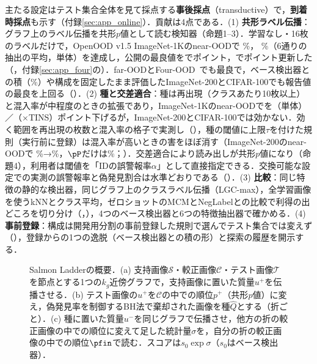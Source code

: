 主たる設定はテスト集合全体を見て採点する\textbf{事後採点}（transductive）で，\textbf{到着時採点}も示す（付録\ref{sec:app_online}）．貢献は4点である．(1) \textbf{共形ラベル伝播}：グラフ上のラベル伝播を共形$p$値として読む検知器（命題1--3）．学習なし・16枚のラベルだけで，OpenOOD v1.5 ImageNet-1Kのnear-OODで\AUC{} \NAloneNearAuroc\%，\FPR{} \NAloneNearFpr\%（6通りの抽出の平均，単体）を達成し，公開の最良値を\AUC{}で\NAloneGapNearAuroc{}ポイント，\FPR{}で\NAloneGapNearFpr{}ポイント更新した（，付録\ref{sec:app_four}の）．far-OODとFour-OOD~\cite{huang2021mos}でも最良で，ベース検出器との積（\NNearFpr\%）や構成を固定したまま評価したImageNet-200とCIFAR-100でも報告値の最良を上回る（）．(2) \textbf{種と交差適合}：種は再出現（クラスあたり10枚以上）と混入率が中程度のときの拡張であり，ImageNet-1Kのnear-OODで\FPR{}を\NAloneNearDfprVsLpAbs{}（単体）／\NNearDfprVsLpAbs{}（$\times$TINS）ポイント下げるが，ImageNet-200とCIFAR-100では効かない．効く範囲を再出現の枚数と混入率の格子で実測し（），種の閾値に上限$\tau$を付けた規則（実行前に登録）は混入率が高いときの害をほぼ消す（ImageNet-200のnear-OODで\FPR{} \NInTwoZeroZeroMainNearFpr\%→\NInTwoZeroZeroStoreycNearFpr\%，$\pP$だけは\NInTwoZeroZeroLpNearFpr\%；）．交差適合により読み出しが共形$p$値になり（命題4），利用者は閾値を「IDの誤警報率$\alpha$」として直接指定できる．交換可能な設定での実測の誤警報率と偽発見割合は水準どおりである（）．(3) \textbf{比較}：同じ特徴の静的な検出器，同じグラフ上のクラスラベル伝播（LGC-max），全学習画像を使うkNNとクラス平均，ゼロショットのMCMとNegLabelとの比較で利得の出どころを切り分け（，），4つのベース検出器と6つの特徴抽出器で確かめる．(4) \textbf{事前登録}：構成は開発用分割の事前登録した規則で選んでテスト集合では変えず（），登録からの1つの逸脱（ベース検出器との積の形）と探索の履歴を開示する．

\begin{figure}[t]
\centering
\scalebox{0.76}{}
\caption{Salmon Ladderの概要．(a) 支持画像$\mathcal{S}$・較正画像$\mathcal{C}$・テスト画像$\mathcal{T}$を節点とする1つの$k_g$近傍グラフで，支持画像に置いた質量$u^{+}$を伝播させる．(b) テスト画像の$u^{+}$を$\mathcal{C}$の中での順位$p^{+}$（共形$p$値）に変え，偽発見率を制御するBH法で棄却された画像を種$\hat{Q}$とする（折ごと）．(c) 種に置いた質量$u^{-}$を同じグラフで伝播させ，他方の折の較正画像の中での順位に変えて足した統計量$\sigma$を，自分の折の較正画像の中での順位$\pfin$で読む．スコアは$s_0\exp\sigma$（$s_0$はベース検出器）．}
\label{fig:overview}
\end{figure}


